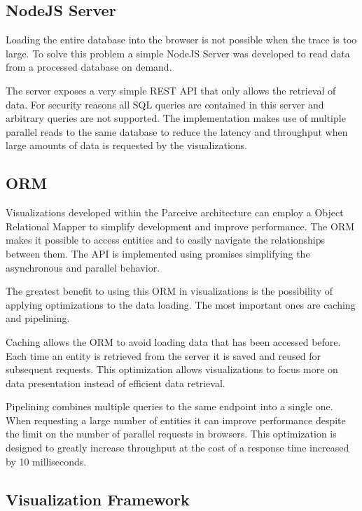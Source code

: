 \documentclass[conference]{IEEEtran}
\begin{document}
\subsection{NodeJS Server}

Loading the entire database into the browser is not possible when the trace is too large. To solve this problem a simple NodeJS Server was developed to read data from a processed database on demand.

The server exposes a very simple REST \cite{rest} API that only allows the retrieval of data. For security reasons all SQL queries are contained in this server and  arbitrary queries are not supported. The implementation makes use of multiple parallel reads to the same database to reduce the latency and throughput when large amounts of data is requested by the visualizations.

\subsection{ORM}

Visualizations developed within the Parceive architecture can employ a Object Relational Mapper to simplify development and improve performance. The ORM makes it possible to access entities and to easily navigate the relationships between them. The API is implemented using promises \cite{promises} simplifying the asynchronous and parallel behavior.

The greatest benefit to using this ORM in visualizations is the possibility of applying optimizations to the data loading. The most important ones are caching and pipelining.

Caching allows the ORM to avoid loading data that has been accessed before. Each time an entity is retrieved from the server it is saved and reused for subsequent requests. This optimization allows visualizations to focus more on data presentation instead of efficient data retrieval.

Pipelining combines multiple queries to the same endpoint into a single one. When requesting a large number of entities it can improve performance despite the limit on the number of parallel requests in browsers. This optimization is designed to greatly increase throughput at the cost of a response time increased by 10 milliseconds.

\subsection{Visualization Framework}
\end{document}
